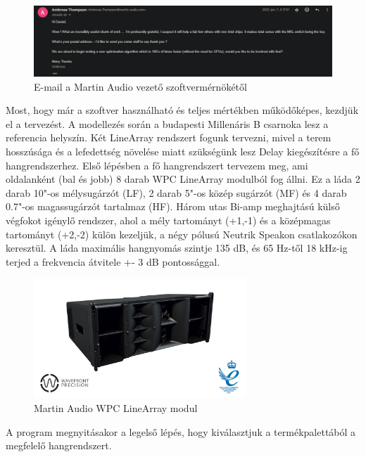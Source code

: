 \begin{figure}[H]
	\centering
	\includegraphics[width=\textwidth, keepaspectratio]{figures/ambrose_email.png}
	\caption{E-mail a Martin Audio vezető szoftvermérnökétől}
	\label{fig:ambrose_email}
\end{figure}
Most, hogy már a szoftver használható és teljes mértékben működőképes, kezdjük el a tervezést.
A modellezés során a budapesti Millenáris B csarnoka lesz a referencia helyszín. Két LineArray rendszert fogunk
tervezni, mivel a terem hosszúsága és a lefedettség növelése miatt szükségünk lesz Delay kiegészítésre a fő hangrendszerhez.
Első lépésben a fő hangrendszert tervezem meg, ami oldalanként (bal és jobb) 8 darab WPC LineArray modulból fog állni.
Ez a láda 2 darab 10"-os mélysugárzót (LF), 2 darab 5"-os közép sugárzót (MF) és 4 darab 0.7"-os magassugárzót tartalmaz (HF).
Három utas Bi-amp meghajtású külső végfokot igénylő rendszer, ahol a mély tartományt (+1,-1) és a középmagas tartományt (+2,-2) külön kezeljük,
a négy pólusú Neutrik Speakon csatlakozókon keresztül.
A láda maximális hangnyomás szintje 135 dB, és 65 Hz-től 18 kHz-ig terjed a frekvencia átvitele +- 3 dB pontossággal. \cite{WPCUSERGUIDE}
\begin{figure}[H]
	\centering
	\includegraphics[width=80mm, keepaspectratio]{figures/wpc_front_view.jpg}
	\caption{Martin Audio WPC LineArray modul}\label{fig:wpc}
\end{figure}
A program megnyitásakor a legelső lépés, hogy kiválasztjuk a termékpalettából a megfelelő hangrendszert.

